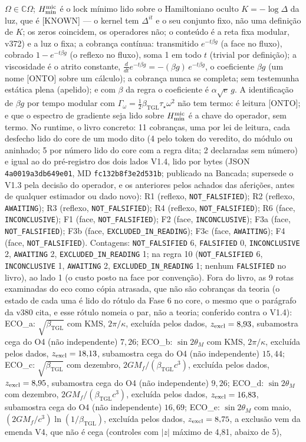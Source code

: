 \documentclass[11pt]{article}
\newcommand{\bTGL}{\beta_{\mathrm{TGL}}}\newcommand{\Msun}{M_{\odot}}\newcommand{\TGL}{\mathrm{TGL}}
\theoremstyle{definition}\newtheorem{deriv}{Derivação}
\begin{document}
$\Omega\in\mathbb C\Omega$; $H_{\min}^{\rm mic}$ é o lock mínimo lido sobre o Hamiltoniano oculto $K=-\log\Delta$ da luz, que é \textsf{[KNOWN]} --- o kernel tem $\Delta^{it}$ e o seu conjunto fixo, não uma definição de $K$; os zeros coincidem, os operadores não; o conteúdo é a reta fixa modular, v372) e a luz o fixa; a cobrança contínua: transmitido $e^{-t\beta g}$ (a face no fluxo), cobrado $1-e^{-t\beta g}$ (o reflexo no fluxo), soma 1 em todo $t$ (trivial por definição); a viscosidade é o atrito constante, $\tfrac{d}{dt}e^{-t\beta g}=-(\beta g)\,e^{-t\beta g}$, o coeficiente $\beta g$ (um nome \textsf{[ONTO]} sobre um cálculo); a cobrança nunca se completa; sem testemunha estática plena (apelido); e com $\beta$ da regra o coeficiente é $\alpha\sqrt e\,g$. A identificação de $\beta g$ por tempo modular com $\Gamma_\omega=\tfrac12\bTGL\tau_\star\omega^2$ não tem termo: é leitura \textsf{[ONTO]}; e que o espectro de gradiente seja lido sobre $H_{\min}^{\rm mic}$ é a chave do operador, sem termo. No runtime, o livro concreto: 11 cobranças, uma por lei de leitura, cada desfecho lido do core de um modo dito (4 pelo token do veredito, do módulo ou aninhado; 5 por número lido do core com a regra dita; 2 declaradas sem número) e igual ao do pré-registro dos dois lados V1.4, lido por bytes (JSON \texttt{4a0019a3db649e01}, MD \texttt{fc132b8f3e2d531b}; publicado na Bancada; supersede o V1.3 pela decisão do operador, e os anteriores pelos achados das aferições, antes de qualquer estimador ou dado novo): R1 (reflexo, \texttt{NOT\_FALSIFIED}); R2 (reflexo, \texttt{AWAITING}); R3 (reflexo, \texttt{NOT\_FALSIFIED}); R4 (reflexo, \texttt{NOT\_FALSIFIED}); R6 (face, \texttt{INCONCLUSIVE}); F1 (face, \texttt{NOT\_FALSIFIED}); F2 (face, \texttt{INCONCLUSIVE}); F3a (face, \texttt{NOT\_FALSIFIED}); F3b (face, \texttt{EXCLUDED\_IN\_READING}); F3c (face, \texttt{AWAITING}); F4 (face, \texttt{NOT\_FALSIFIED}). Contagens: \texttt{NOT\_FALSIFIED} 6, \texttt{FALSIFIED} 0, \texttt{INCONCLUSIVE} 2, \texttt{AWAITING} 2, \texttt{EXCLUDED\_IN\_READING} 1; na regra 10 (\texttt{NOT\_FALSIFIED} 6, \texttt{INCONCLUSIVE} 1, \texttt{AWAITING} 2, \texttt{EXCLUDED\_IN\_READING} 1; nenhum \texttt{FALSIFIED} no livro), ao lado 1 (o custo posto na face por convenção). Fora do livro, as 9 rotas examinadas do eco como cópia atrasada, que não são cobranças da teoria (o estado de cada uma é lido do rótulo da Fase 6 no core, o mesmo que o parágrafo da v380 cita, e esse rótulo nomeia o par, não a teoria; conferido contra o V1.4): ECO\_a: $\sqrt{\bTGL}$ com KMS, $2\pi/\kappa$, excluída pelos dados, $z_{\rm excl}=8{,}93$, subamostra cega do O4 (não independente) $7{,}26$; ECO\_b: $\sin 2\theta_M$ com KMS, $2\pi/\kappa$, excluída pelos dados, $z_{\rm excl}=18{,}13$, subamostra cega do O4 (não independente) $15{,}44$; ECO\_c: $\sqrt{\bTGL}$ com dezembro, $2GM_f/(\bTGL c^3)$, excluída pelos dados, $z_{\rm excl}=8{,}95$, subamostra cega do O4 (não independente) $9{,}26$; ECO\_d: $\sin 2\theta_M$ com dezembro, $2GM_f/(\bTGL c^3)$, excluída pelos dados, $z_{\rm excl}=16{,}83$, subamostra cega do O4 (não independente) $16{,}69$; ECO\_e: $\sin 2\theta_M$ com maio, $(2GM_f/c^3)\ln(1/\bTGL)$, excluída pelos dados, $z_{\rm excl}=8{,}75$, a exclusão vem da emenda V4, que não é cega (controles com $|z|$ máximo de 4{,}81, abaixo de 5), 
\end{document}
